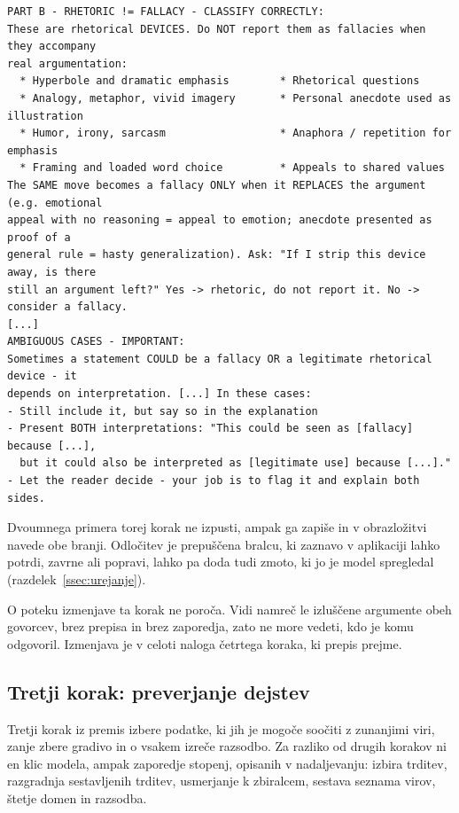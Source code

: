 \documentclass[a4paper, 12pt]{book}
\begin{document}
\begin{lstlisting}[basicstyle=\ttfamily\scriptsize,breaklines=true]
PART B - RHETORIC != FALLACY - CLASSIFY CORRECTLY:
These are rhetorical DEVICES. Do NOT report them as fallacies when they accompany
real argumentation:
  * Hyperbole and dramatic emphasis        * Rhetorical questions
  * Analogy, metaphor, vivid imagery       * Personal anecdote used as illustration
  * Humor, irony, sarcasm                  * Anaphora / repetition for emphasis
  * Framing and loaded word choice         * Appeals to shared values
The SAME move becomes a fallacy ONLY when it REPLACES the argument (e.g. emotional
appeal with no reasoning = appeal to emotion; anecdote presented as proof of a
general rule = hasty generalization). Ask: "If I strip this device away, is there
still an argument left?" Yes -> rhetoric, do not report it. No -> consider a fallacy.
[...]
AMBIGUOUS CASES - IMPORTANT:
Sometimes a statement COULD be a fallacy OR a legitimate rhetorical device - it
depends on interpretation. [...] In these cases:
- Still include it, but say so in the explanation
- Present BOTH interpretations: "This could be seen as [fallacy] because [...],
  but it could also be interpreted as [legitimate use] because [...]."
- Let the reader decide - your job is to flag it and explain both sides.
\end{lstlisting}

Dvoumnega primera torej korak ne izpusti, ampak ga zapiše in v obrazložitvi
navede obe branji. Odločitev je prepuščena bralcu, ki zaznavo v aplikaciji lahko
potrdi, zavrne ali popravi, lahko pa doda tudi zmoto, ki jo je model
spregledal (razdelek~\ref{ssec:urejanje}).

O poteku izmenjave ta korak ne poroča. Vidi namreč le izluščene argumente obeh
govorcev, brez prepisa in brez zaporedja, zato ne more vedeti, kdo je komu
odgovoril. Izmenjava je v celoti naloga četrtega koraka, ki prepis prejme.


\subsection{Tretji korak: preverjanje dejstev}
\label{sec:fact-checking}

Tretji korak iz premis izbere podatke, ki jih je mogoče soočiti z zunanjimi
viri, zanje zbere gradivo in o vsakem izreče razsodbo. Za razliko od drugih
korakov ni en klic modela, ampak zaporedje stopenj, opisanih v nadaljevanju:
izbira trditev, razgradnja sestavljenih trditev, usmerjanje k zbiralcem, sestava
seznama virov, štetje domen in razsodba.
\end{document}
